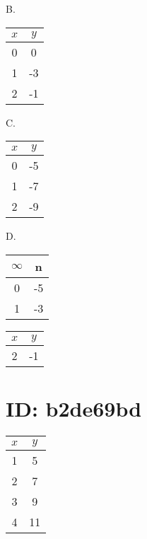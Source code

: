 B.

\begin{center}
\begin{tabular}{|c|c|}
\hline
$x$ & $y$ \\
\hline
0 & 0 \\
\hline
1 & -3 \\
\hline
2 & -1 \\
\hline
\end{tabular}
\end{center}

C.

\begin{center}
\begin{tabular}{|c|c|}
\hline
$x$ & $y$ \\
\hline
0 & -5 \\
\hline
1 & -7 \\
\hline
2 & -9 \\
\hline
\end{tabular}
\end{center}

D.

\begin{center}
\begin{tabular}{|c|c|}
\hline
$\infty$ & n \\
\hline
0 & -5 \\
\hline
1 & -3 \\
\hline
\end{tabular}
\end{center}

\begin{center}
\begin{tabular}{|c|c|}
\hline
$x$ & $y$ \\
\hline
2 & -1 \\
\hline
\end{tabular}
\end{center}

\section*{ID: b2de69bd}
\begin{center}
\begin{tabular}{|c|c|}
\hline
$x$ & $y$ \\
\hline
1 & 5 \\
\hline
2 & 7 \\
\hline
3 & 9 \\
\hline
4 & 11 \\
\hline
\end{tabular}
\end{center}

